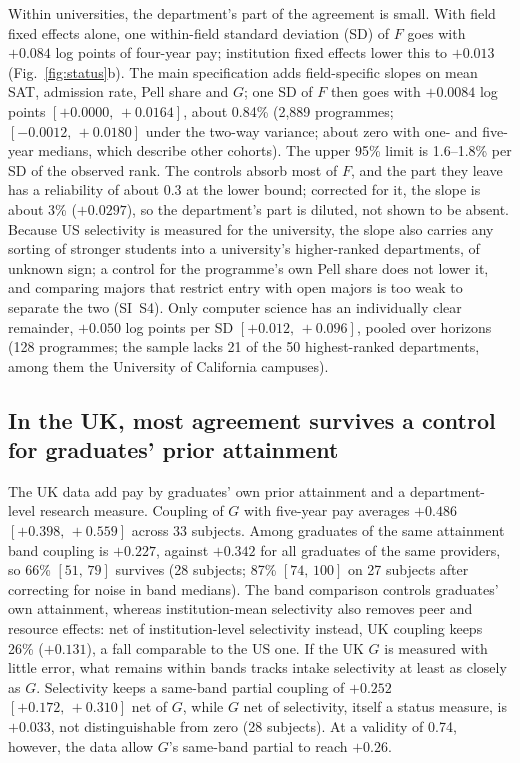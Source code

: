 \documentclass[11pt]{article}
\newcommand{\ci}[2]{$[#1,\allowbreak\,#2]$}
\begin{document}
Within universities, the department's part of the agreement is small. With field fixed effects alone, one
within-field standard deviation (SD) of $F$ goes with $+0.084$ log points of four-year pay; institution fixed effects
lower this to $+0.013$ (Fig.~\ref{fig:status}b). The main specification adds field-specific slopes on mean SAT,
admission rate, Pell share and $G$; one SD of $F$ then goes with $+0.0084$ log points \ci{+0.0000}{+0.0164}, about
0.84\% (2,889 programmes; \ci{-0.0012}{+0.0180} under the two-way variance; about zero with one- and five-year
medians, which describe other cohorts). The upper 95\% limit is 1.6--1.8\% per SD of the observed rank. The controls
absorb most of $F$, and the part they leave has a reliability of about 0.3 at the lower bound; corrected for it, the
slope is about 3\% ($+0.0297$), so the department's part is diluted, not shown to be absent. Because US selectivity
is measured for the university, the slope also carries any sorting of stronger students into a university's
higher-ranked departments, of unknown sign; a control for the programme's own Pell share does not lower it, and
comparing majors that restrict entry with open majors is too weak to separate the two (SI~S4). Only computer science
has an individually clear remainder, $+0.050$ log points per SD \ci{+0.012}{+0.096}, pooled over horizons (128
programmes; the sample lacks 21 of the 50 highest-ranked departments, among them the University of California
campuses).

\subsection{In the UK, most agreement survives a control for graduates' prior attainment}\label{sec:res-uk}

The UK data add pay by graduates' own prior attainment and a department-level research measure. Coupling of $G$ with five-year pay averages $+0.486$ \ci{+0.398}{+0.559} across 33 subjects. Among graduates of the
same attainment band coupling is $+0.227$, against $+0.342$ for all graduates of the same providers, so 66\%
\ci{51}{79} survives (28 subjects; 87\% \ci{74}{100} on 27 subjects after correcting for noise in band medians). The
band comparison controls graduates' own attainment, whereas institution-mean selectivity also removes peer and
resource effects: net of institution-level selectivity instead, UK coupling keeps 26\% ($+0.131$), a fall comparable
to the US one. If the UK $G$ is measured with little error, what remains within bands tracks intake selectivity at
least as closely as $G$. Selectivity keeps a same-band partial coupling of $+0.252$ \ci{+0.172}{+0.310} net of $G$,
while $G$ net of selectivity, itself a status measure, is $+0.033$, not distinguishable from zero (28 subjects). At a
validity of 0.74, however, the data allow $G$'s same-band partial to reach $+0.26$.
\end{document}
